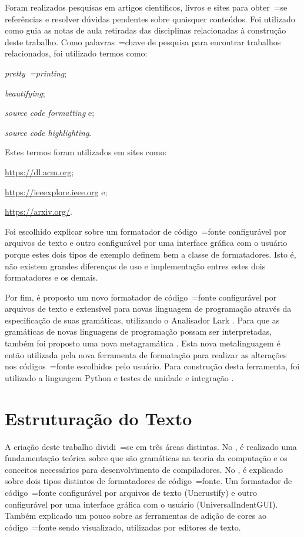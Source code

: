 Foram realizados pesquisas em artigos científicos,
livros e
sites para obter~=se referências e
resolver dúvidas pendentes sobre quaisquer conteúdos.
Foi utilizado como guia as notas de aula retiradas das disciplinas relacionadas à construção deste trabalho.
Como palavras~=chave de pesquisa para encontrar trabalhos relacionados,
foi utilizado termos como:
\begin{inparaenum}[1)]
\item \textit{pretty~=printing};
\item \textit{beautifying};
\item \textit{source code formatting} e;
\item \textit{source code highlighting}.
\end{inparaenum}%
Estes termos foram utilizados em sites como:
\begin{inparaenum}[1)]
\item \url{https://dl.acm.org};
\item \url{https://ieeexplore.ieee.org} e;
\item \url{https://arxiv.org/}.
\end{inparaenum}%

Foi escolhido explicar sobre um formatador de código~=fonte configurável por arquivos de texto e
outro configurável por uma interface gráfica com o usuário porque estes dois tipos de exemplo definem bem a classe de formatadores.
Isto é,
não existem grandes diferenças de uso e
implementação entres estes dois formatadores e
os demais.

Por fim,
é proposto um novo formatador de código~=fonte configurável por arquivos de texto e
extensível para novas linguagem de programação através da especificação de suas gramáticas,
utilizando o Analisador Lark \cite{larkContextualLexer}.
Para que as gramáticas de novas linguagens de programação possam ser interpretadas,
também foi proposto uma nova metagramática \cite{theUseOfMetaRules}.
Esta nova metalinguagem \cite{compilersCompilerMetaLanguage} é então utilizada pela nova ferramenta de formatação para realizar as alterações nos códigos~=fonte escolhidos pelo usuário.
Para construção desta ferramenta,
foi utilizado a linguagem Python e
testes de unidade e
integração \cite{continuousIntegration}.


\section{Estruturação do Texto}

A criação deste trabalho dividi~=se em três áreas distintas.
No ,
é realizado uma fundamentação teórica sobre que são gramáticas na teoria da computação e
os conceitos necessários para desenvolvimento de compiladores.
No ,
é explicado sobre dois tipos distintos de formatadores de código~=fonte.
Um formatador de código~=fonte configurável por arquivos de texto (Uncrustify) e
outro configurável por uma interface gráfica com o usuário (UniversalIndentGUI).
Também explicado um pouco sobre as ferramentas de adição de cores ao código~=fonte sendo visualizado,
utilizadas por editores de texto.

